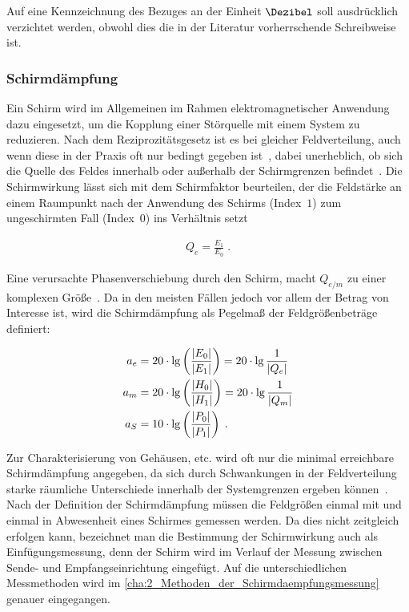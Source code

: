 Auf eine Kennzeichnung des Bezuges an der Einheit $\si{\Dezibel}$ soll ausdrücklich verzichtet werden, obwohl dies die in der Literatur vorherrschende Schreibweise ist. 


\subsubsection{Schirmdämpfung}\label{cha:2_subsub_Schirmdaempfung}

Ein Schirm wird im Allgemeinen im Rahmen elektromagnetischer Anwendung dazu eingesetzt, um die Kopplung einer Störquelle mit einem System zu reduzieren. Nach dem Reziprozitätsgesetz ist es bei gleicher Feldverteilung, auch wenn diese in der Praxis oft nur bedingt gegeben ist~\cite{EMV-gerechtes_Geraetedesign}, dabei unerheblich, ob sich die Quelle des Feldes innerhalb oder außerhalb der Schirmgrenzen befindet~\cite{EM_Schirmung}. Die Schirmwirkung lässt sich mit dem Schirmfaktor beurteilen, der die Feldstärke an einem Raumpunkt nach der Anwendung des Schirms (Index~\glqq$1$\grqq) zum ungeschirmten Fall (Index~\glqq$0$\grqq) ins Verhältnis setzt~\cite{EM_Schirmung}

\begin{align}
    Q_e = \frac{E_1}{E_0} \; \text{.}
\end{align}

\par
\vspace{\linespace}
Eine verursachte Phasenverschiebung durch den Schirm, macht $Q_{e/m}$ zu einer komplexen Größe~\cite{EM_Schirmung}. Da in den meisten Fällen jedoch vor allem der Betrag von Interesse ist, wird die Schirmdämpfung als Pegelmaß der Feldgrößenbeträge definiert:

\begin{align}
    a_e &= 20 \cdot \lg \left(\frac{\lvert E_0\rvert}{\lvert E_1\rvert}\right) = 20 \cdot \lg \frac{1}{\lvert Q_e\rvert} \label{eq:2_Schirmdaempfung_elektrisch}\\
    a_m &= 20 \cdot \lg \left(\frac{\lvert H_0\rvert}{\lvert H_1\rvert}\right) = 20 \cdot \lg \frac{1}{\lvert Q_m\rvert} \label{eq:2_Schirmdaempfung_magnetisch}\\
    a_S &= 10 \cdot \lg \left(\frac{\lvert P_0\rvert}{\lvert P_1\rvert}\right) \; \text{.} \label{eq:2_Schirmdaempfung_Leistung}
\end{align}

Zur Charakterisierung von Gehäusen, etc. wird oft nur die minimal erreichbare Schirmdämpfung angegeben, da sich durch Schwankungen in der Feldverteilung starke räumliche Unterschiede innerhalb der Systemgrenzen ergeben können~\cite{EM_Schirmung}. Nach der Definition der Schirmdämpfung müssen die Feldgrößen einmal mit und einmal in Abwesenheit eines Schirmes gemessen werden. Da dies nicht zeitgleich erfolgen kann, bezeichnet man die Bestimmung der Schirmwirkung auch als Einfügungsmessung, denn der Schirm wird im Verlauf der Messung zwischen Sende- und Empfangseinrichtung eingefügt. Auf die unterschiedlichen Messmethoden wird im \Abschnitt\ref{cha:2_Methoden_der_Schirmdaempfungsmessung} genauer eingegangen.


